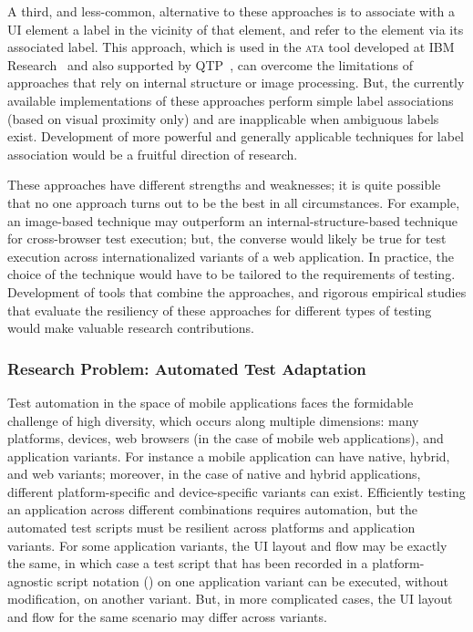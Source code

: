 A third, and less-common, alternative to these approaches is to associate with a
UI element a label in the vicinity of that element, and refer to the element via
its associated label. This approach, which is used in the \textsc{ata} tool
developed at IBM Research~\cite{thummalapenta:2012b, thummalapenta:2012a,
  thummalapenta:2013a} and also supported by QTP~\cite{hpqtp}, can overcome the
limitations of approaches that rely on internal structure or image
processing. But, the currently available implementations of these approaches
perform simple label associations (based on visual proximity only) and are
inapplicable when ambiguous labels exist. Development of more powerful and
generally applicable techniques for label association would be a fruitful
direction of research.

These approaches have different strengths and weaknesses; it is quite possible
that no one approach turns out to be the best in all circumstances. For example,
an image-based technique may outperform an internal-structure-based technique
for cross-browser test execution; but, the converse would likely be true for
test execution across internationalized variants of a web application. In
practice, the choice of the technique would have to be tailored to the
requirements of testing.  Development of tools that combine the approaches, and
rigorous empirical studies that evaluate the resiliency of these approaches for
different types of testing would make valuable research contributions.


\subsubsection*{Research Problem: Automated Test Adaptation}

Test automation in the space of mobile applications faces the form\-idable
challenge of high diversity, which occurs along multiple dimensions: many
platforms, devices, web browsers (in the case of mobile web applications), and
application variants. For instance a mobile application can have native, hybrid,
and web variants; moreover, in the case of native and hybrid applications,
different platform-specific and device-specific variants can exist. Efficiently
testing an application across different combinations requires automation, but
the automated test scripts must be resilient across platforms and application
variants. For some application variants, the UI layout and flow may be exactly
the same, in which case a test script that has been recorded in a
platform-agnostic script notation (\eg \cite{PerfectoScriptOnce}) on one
application variant can be executed, without modification, on another variant.
But, in more complicated cases, the UI layout and flow for the same scenario may
differ across variants.

